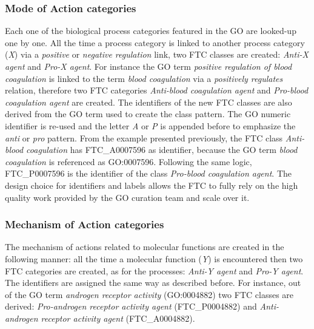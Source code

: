 \subsubsection{Mode of Action categories}
Each one of the biological process categories featured in the GO are looked-up one by one. All the time a process category is linked to another process category (\emph{X}) via a \emph{positive} or \emph{negative regulation} link, two FTC classes are created: \emph{Anti-X agent} and \emph{Pro-X agent}. For instance the GO term \emph{positive regulation of blood coagulation} is linked to the term \emph{blood coagulation} via a \emph{positively regulates} relation, therefore two FTC categories \emph{Anti-blood coagulation agent} and \emph{Pro-blood coagulation agent} are created. The identifiers of the new FTC classes are also derived from the GO term used to create the class pattern. The GO numeric identifier is re-used and the letter \emph{A} or \emph{P} is appended before to emphasize the \emph{anti} or \emph{pro} pattern. From the example presented previously, the FTC class \emph{Anti-blood coagulation} has FTC\_A0007596 as identifier, because the GO term \emph{blood coagulation} is referenced as GO:0007596. Following the same logic, FTC\_P0007596 is the identifier of the class \emph{Pro-blood coagulation agent}. The design choice for identifiers and labels allows the FTC to fully rely on the high quality work provided by the GO curation team and scale over it.

\subsubsection{Mechanism of Action categories}
The mechanism of actions related to molecular functions are created in the following manner: all the time a molecular function (\emph{Y}) is encountered then two FTC categories are created, as for the processes: \emph{Anti-Y agent} and \emph{Pro-Y agent}. The identifiers are assigned the same way as described before. For instance, out of the GO term \emph{androgen receptor activity} (GO:0004882) two FTC classes are derived: \emph{Pro-androgen receptor activity agent} (FTC\_P0004882) and \emph{Anti-androgen receptor activity agent} (FTC\_A0004882).

